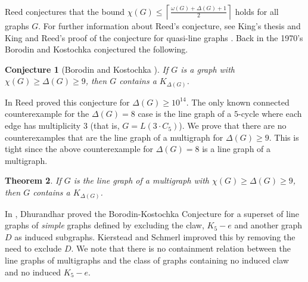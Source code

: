 \documentclass[12pt]{article}
\theoremstyle{plain}
\newtheorem{thm}{Theorem}
\newtheorem{conjecture}[thm]{Conjecture}
\theoremstyle{definition}
\theoremstyle{remark}
\begin{document}
Reed \cite{reed1998omega} conjectures that the bound $\chi(G) \leq \left\lceil \frac{\omega(G) + \Delta(G) + 1}{2}\right\rceil$ holds for all graphs $G$.
For further information about Reed's conjecture, see King's thesis \cite{king2009claw} and King and Reed's proof of the conjecture for quasi-line graphs \cite{king2008bounding}. Back in the 1970's Borodin and Kostochka \cite{borodin1977upper} conjectured the following. 

\begin{conjecture}[Borodin and Kostochka \cite{borodin1977upper}]
If $G$ is a graph with $\chi(G) \geq \Delta(G) \geq 9$, then $G$ contains a $K_{\Delta(G)}$.
\end{conjecture}

In \cite{reed1999strengthening} Reed proved this conjecture for $\Delta(G) \geq 10^{14}$.  The only known connected counterexample for the $\Delta(G) = 8$ case is the line graph of a $5$-cycle where each edge has multiplicity $3$ (that is, $G = L(3\cdot C_5)$).  We prove that there are no counterexamples that are the line graph of a multigraph for $\Delta(G) \geq 9$. This is tight since the above counterexample for $\Delta(G) = 8$ is a line graph of a multigraph.

\begin{thm}\label{BKForLine}
If $G$ is the line graph of a multigraph with $\chi(G) \geq \Delta(G) \geq 9$, then  $G$ contains a $K_{\Delta(G)}$.
\end{thm}

In \cite{dhurandhar1982improvement}, Dhurandhar proved the Borodin-Kostochka Conjecture for a superset of line graphs of \emph{simple} graphs defined by excluding the claw, $K_5 - e$ and another graph $D$ as induced subgraphs.  Kierstead and Schmerl \cite{kierstead1986chromatic} improved this by removing the need to exclude $D$.  We note that there is no containment relation between the line graphs of multigraphs and the class of graphs containing no induced claw and no induced $K_5 - e$.
\end{document}
